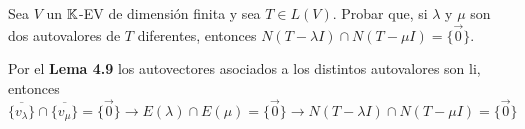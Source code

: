 \item Sea $V$ un $\mathbb{K}$-EV de dimensión finita y sea $T\in L(V)$. Probar que, si $\lambda$ y $\mu$ son dos autovalores de $T$ diferentes, entonces $N(T-\lambda I)\cap N(T-\mu I)=\{\vec{0}\}$.
    \begin{mdframed}[style=s]
        Por el \textbf{Lema 4.9} los autovectores asociados a los distintos autovalores son li, entonces $\overline{\{v_\lambda\}}\cap\overline{\{v_\mu\}}=\{\vec{0}\}\to E(\lambda)\cap E(\mu)=\{\vec{0}\}\to N(T-\lambda I)\cap N(T-\mu I)=\{\vec{0}\}$
    \end{mdframed}